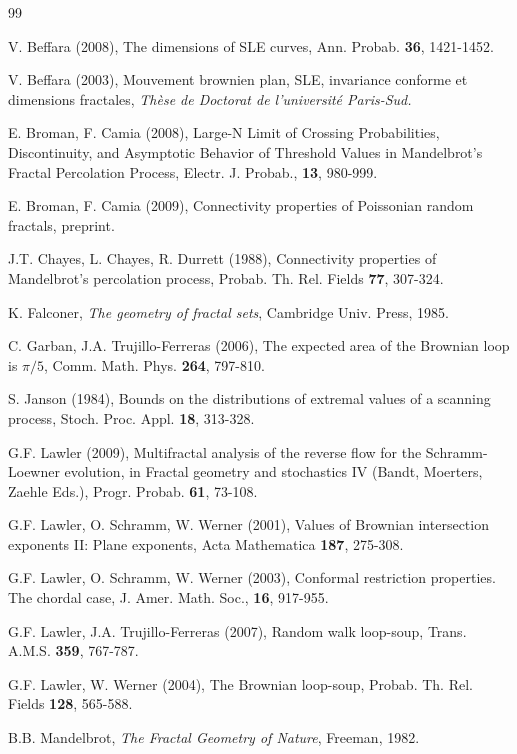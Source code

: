 \documentclass[11pt]{article}
\begin{document}
\begin {thebibliography}{99}

{V. Beffara (2008),
The dimensions of SLE curves, Ann. Probab. {\bf 36}, 1421-1452.}

{V. Beffara (2003),
Mouvement brownien plan, SLE, invariance conforme et dimensions fractales,
{\it Th\`ese de Doctorat de l'universit\'e Paris-Sud.}}

{E. Broman, F. Camia (2008),
Large-N Limit of Crossing Probabilities, Discontinuity, and Asymptotic Behavior of Threshold Values in Mandelbrot's Fractal Percolation Process,
Electr. J. Probab., 
{\bf 13}, 980-999.}

{E. Broman, F. Camia (2009),
Connectivity properties of Poissonian random fractals, preprint.}

{J.T. Chayes, L. Chayes, R. Durrett (1988),
Connectivity properties of Mandelbrot's percolation process,
{Probab. Th. Rel. Fields} {\bf  77},   307-324.}

{K. Falconer, {\em The geometry of fractal sets}, Cambridge Univ. Press, 1985.}

{C. Garban, J.A. Trujillo-Ferreras (2006),
The expected area of the Brownian loop is $\pi/5$,
Comm. Math. Phys. {\bf 264}, 797-810.}

{S. Janson (1984),
Bounds on the distributions of extremal values of a scanning process, Stoch. Proc. Appl. {\bf 18}, 313-328.}

{G.F. Lawler (2009),
Multifractal analysis of the reverse flow for the Schramm-Loewner evolution, 
in Fractal geometry and stochastics IV (Bandt, Moerters, Zaehle Eds.), Progr. Probab. {\bf 61},
73-108.
}

{G.F. Lawler, O. Schramm, W. Werner (2001),
Values of Brownian intersection exponents II: Plane exponents,
Acta Mathematica {\bf 187}, 275-308.}

{G.F. Lawler, O. Schramm, W. Werner (2003),
Conformal restriction properties. The chordal case,
J. Amer. Math. Soc., {\bf 16}, 917-955.}

{G.F. Lawler, J.A. Trujillo-Ferreras (2007),
Random walk loop-soup, Trans. A.M.S. {\bf 359}, 767-787.}

{G.F. Lawler, W. Werner (2004),
The Brownian loop-soup, 
Probab. Th. Rel. Fields {\bf 128}, 565-588.}

{B.B. Mandelbrot,
{\em The Fractal Geometry of Nature},
Freeman, 1982.}


\end{thebibliography}
\end{document}
